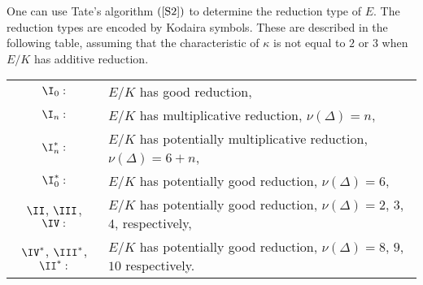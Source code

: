 One can use Tate's algorithm $(\cite[\S \text{IV}.9]{S2})$ to determine the reduction type of $E$. The reduction types are encoded by Kodaira symbols. These are described in the following table, assuming that the characteristic of $\kappa$ is not equal to $2$ or $3$ when $E / K$ has additive reduction.
\begin{table}[H]
    \centering
    \begin{tabular}{ c | l }
        $\I_0:$ & $E / K$ has good reduction, \\ 
        $\I_n:$ & $E / K$ has multiplicative reduction, $\nu(\Delta) = n$,\\
        $\I_n^* :$ & $E / K$ has potentially multiplicative reduction, $\nu(\Delta) = 6 + n$, \\
        $\I_0^*:$ & $E / K$ has potentially good reduction, $\nu(\Delta) = 6$, \\
        $\II$, $\III$, $\IV:$ & $E / K$ has potentially good reduction, $\nu(\Delta) = 2$, $3$, $4$, respectively,\\
        $\IV^*$, $\III^*$, $\II^*:$ & $E / K$ has potentially good reduction, $\nu(\Delta) = 8$, $9$, $10$ respectively. 
    \end{tabular}
\end{table}


